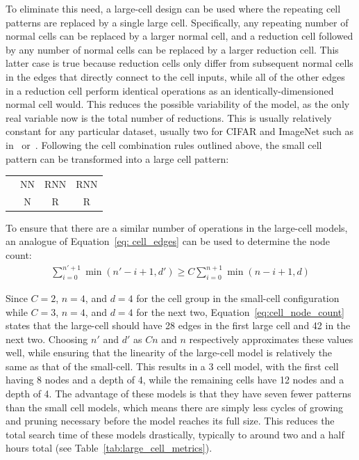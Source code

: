 To eliminate this need, a large-cell design can be used where the repeating cell patterns are replaced by a single large
cell. Specifically, any repeating number of normal cells can be replaced by a larger normal cell, and a reduction cell
followed by any number of normal cells can be replaced by a larger reduction cell. This latter case is true because
reduction cells only differ from subsequent normal cells in the edges that directly connect to the cell inputs, while all
of the other edges in a reduction cell perform identical operations as an identically-dimensioned normal cell would.
This reduces the possible variability of the model, as the only real variable now is the total number of reductions. This
is usually relatively constant for any particular dataset, usually two for CIFAR and ImageNet such as in~\cite{liu2018,xi2019,xu2020} or~\cite{pham2018}.
Following the cell combination rules outlined above, the small cell pattern can be transformed into a large cell pattern:

\begin{center}
\begin{tabular}{rccc}
	\text{Small Cell:} & NN & RNN & RNN \\
	\text{Large Cell:} & N  & R   & R
\end{tabular}
\end{center}

To ensure that there are a similar number of operations in the large-cell models, an analogue of Equation~\ref{eq: cell_edges}
can be used to determine the node count:
\begin{align}
	\sum_{i=0}^{n'+1} \min(n'-i+1, d') \ge C \sum_{i=0}^{n+1} \min(n-i+1, d) \label{eq:cell_node_count}
\end{align}

Since $C=2$, $n=4$, and $d=4$ for the cell group in the small-cell configuration while $C=3$, $n=4$, and $d=4$ for
the next two, Equation~\ref{eq:cell_node_count} states that the large-cell should have 28 edges in the first large cell and 42 in the next two.
Choosing $n'$ and $d'$ as $Cn$ and $n$ respectively approximates these values well, while ensuring that the linearity
of the large-cell model is relatively the same as that of the small-cell. This results in a 3 cell model, with the first
cell having 8 nodes and a depth of 4, while the remaining cells have 12 nodes and a depth of 4. The advantage of these
models is that they have seven fewer patterns than the small cell models, which means there are simply less cycles of growing
and pruning necessary before the model reaches its full size. This reduces the total search time of these models drastically,
typically to around two and a half hours total (see Table~\ref{tab:large_cell_metrics}).

